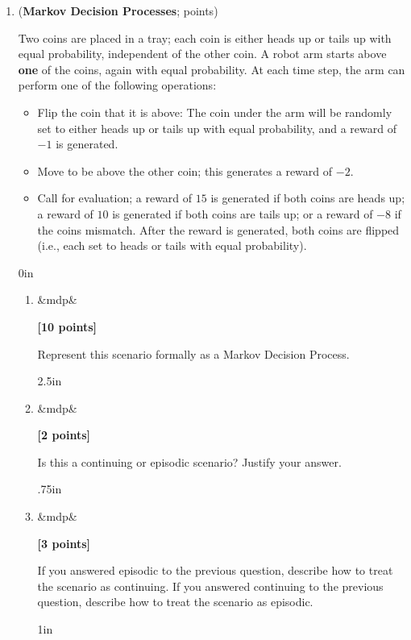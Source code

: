 \documentclass{article}
\newcounter{totalpoints}
\newcommand{\question}[2][]{(\textbf{#2}; \subtotal{#1})}
\newcommand{\subtotal}[1]{\newcounter{#1}\setcounter{#1}{0}\regtotcounter{#1}\total{#1} points}
\newcommand{\points}[2][]{{\addtocounter{totalpoints}{#2}\ifx&#1&\else\addtocounter{#1}{#2}\fi\textbf{[#2 points]}}}
\begin{document}
\clearpage




\begin{enumerate}





\item \question[mdp]{Markov Decision Processes}

Two coins are placed in a tray; each coin is either heads up or tails up with equal probability, independent of the other coin.  A robot arm starts above \textbf{one} of the coins, again with equal probability.  At each time step, the arm can perform one of the following operations:
\begin{itemize}
\item \textsf{Flip} the coin that it is above: The coin under the arm will be randomly set to either heads up or tails up with equal probability, and a reward of $-1$ is generated.
\item \textsf{Move} to be above the other coin; this generates a reward of $-2$.
\item \textsf{Call} for evaluation; a reward of $15$ is generated if both coins are heads up; a reward of $10$ is generated if both coins are tails up; or a reward of $-8$ if the coins mismatch.  After the reward is generated, both coins are flipped (i.e., each set to heads or tails with equal probability).
\end{itemize}
\begin{answer}{0in}
\end{answer}
\begin{enumerate}
\item\points[mdp]{10} \label{q:mdp}
Represent this scenario formally as a Markov Decision Process.

\begin{answer}{2.5in}
\end{answer}

\item\points[mdp]{2}
Is this a continuing or episodic scenario?  Justify your answer.
\begin{answer}{.75in}
\end{answer}

\item\points[mdp]{3}
If you answered episodic to the previous question, describe how to treat the scenario as continuing.
If you answered continuing to the previous question, describe how to treat the scenario as episodic.
\begin{answer}{1in}
\end{answer}
\end{enumerate}


\end{enumerate}
\end{document}
